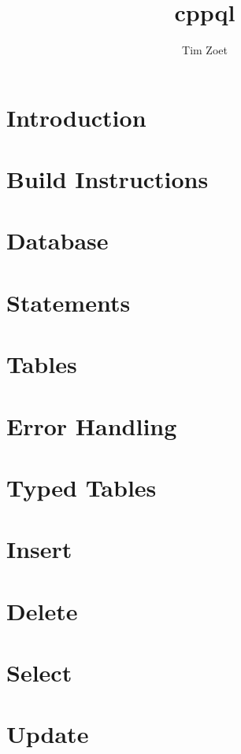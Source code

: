 \documentclass[twoside,a4paper,smallborder=true]{refart}
\title{cppql}
\author{Tim Zoet}
\date{}
\begin{document}
\maketitle

\tableofcontents
\newpage

\section{Introduction}
\label{section:introduction}

\newpage

\section{Build Instructions}
\label{section:build}

\newpage

\section{Database}
\label{section:database}

\newpage

\section{Statements}
\label{section:statements}

\newpage

\section{Tables}
\label{section:tables}

\newpage

\section{Error Handling}
\label{section:errors}

\newpage

\section{Typed Tables}
\label{section:typed_tables}

\newpage

\section{Insert}
\label{section:insert}

\newpage

\section{Delete}
\label{section:delete}

\newpage

\section{Select}
\label{section:select}

\newpage

\section{Update}
\label{section:update}

\newpage

\printglossaries
\newpage

 
 
\printindex
\end{document}
